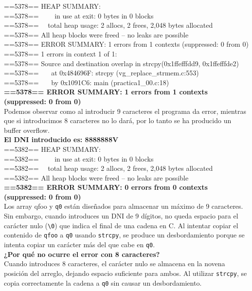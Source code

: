 ==5378== HEAP SUMMARY: 
\\
==5378==     in use at exit: 0 bytes in 0 blocks 
\\
==5378==   total heap usage: 2 allocs, 2 frees, 2,048 bytes allocated 
\\
==5378== All heap blocks were freed -- no leaks are possible 
\\
==5378== ERROR SUMMARY: 1 errors from 1 contexts (suppressed: 0 from 0) 
\\
==5378== 1 errors in context 1 of 1: 
\\
==5378== Source and destination overlap in strcpy(0x1ffefffdd9, 0x1ffefffde2) 
\\
==5378==    at 0x484696F: strcpy (vg\_replace\_strmem.c:553) 
\\
==5378==    by 0x1091C6: main (practica1\_00.c:18) 
\\
\textbf{==5378== ERROR SUMMARY: 1 errors from 1 contexts (suppressed: 0 from 0)}
\vspace{0.3cm}
\\
\noindent Podemos observar como al introducir 9 caracteres el programa da error, mientras que si introducimos 8 caracteres no lo dará, por lo tanto se ha producido un buffer overflow.
\vspace{0.3cm}
\\
\textbf{El DNI introducido es: 8888888V }
\\
==5382== HEAP SUMMARY: 
\\
==5382==     in use at exit: 0 bytes in 0 blocks 
\\
==5382==   total heap usage: 2 allocs, 2 frees, 2,048 bytes allocated 
\\
==5382== All heap blocks were freed -- no leaks are possible 
\\
\textbf{==5382== ERROR SUMMARY: 0 errors from 0 contexts (suppressed: 0 from 0)}
\\
Los array qfoo y \verb|q0| están diseñados para almacenar un máximo de 9 caracteres. Sin embargo, cuando introduces un DNI de 9 dígitos, no queda espacio para el carácter nulo (\verb|\0|) que indica el final de una cadena en C. Al intentar copiar el contenido de \verb|qfoo| a \verb|q0| usando \verb|strcpy|, se produce un desbordamiento porque se intenta copiar un carácter más del que cabe en \verb|q0|.
\vspace{0.3cm}
\\
\textbf{¿Por qué no ocurre el error con 8 caracteres?}
\\
Cuando introduces 8 caracteres, el carácter nulo se almacena en la novena posición del arreglo, dejando espacio suficiente para ambos. Al utilizar \verb|strcpy|, se copia correctamente la cadena a \verb|q0| sin causar un desbordamiento.
